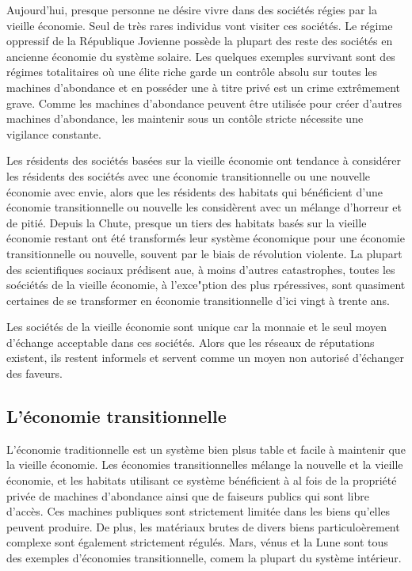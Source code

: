                Aujourd'hui, presque personne ne désire vivre dans des sociétés régies par la vieille économie. Seul de très rares individus vont visiter ces sociétés. Le régime oppressif de la République Jovienne possède la plupart des reste des sociétés en ancienne économie du système solaire. Les quelques exemples survivant sont des régimes totalitaires où une élite riche garde un contrôle absolu sur toutes les machines d'abondance et en posséder une à titre privé est un crime extrêmement grave. Comme les machines d'abondance peuvent être utilisée pour créer d'autres machines d'abondance, les maintenir sous un contôle stricte nécessite une vigilance constante. 

               Les résidents des sociétés basées sur la vieille économie ont tendance à considérer les résidents des sociétés avec une économie transitionnelle ou une nouvelle économie avec envie, alors que les résidents des habitats qui bénéficient d'une économie transitionnelle ou nouvelle les considèrent avec un mélange d'horreur et de pitié. Depuis la Chute, presque un tiers des habitats basés sur la vieille économie restant ont été transformés leur système économique pour une économie transitionnelle ou nouvelle, souvent par le biais de révolution violente. La plupart des scientifiques sociaux prédisent aue, à moins d'autres catastrophes, toutes les soéciétés de la vieille économie, à l'exce"ption des plus rpéressives, sont quasiment certaines de se transformer en économie transitionnelle d'ici vingt à trente ans. 

               Les sociétés de la vieille économie sont unique car la monnaie et le seul moyen d'échange acceptable dans ces sociétés. Alors que les réseaux de réputations existent, ils restent informels et servent comme un moyen non autorisé d'échanger des faveurs. 

               \subsection{L'économie transitionnelle} \label{sec:transitional-economy} 

               L'économie traditionnelle est un système bien plsus table et facile à maintenir que la vieille économie. Les économies transitionnelles mélange la nouvelle et la vieille économie, et les habitats utilisant ce système bénéficient à al fois de la propriété privée de machines d'abondance ainsi que de faiseurs publics qui sont libre d'accès. Ces machines publiques sont strictement limitée dans les biens qu'elles peuvent produire. De plus, les matériaux brutes de divers biens particuloèrement complexe sont également strictement régulés. Mars, vénus et la Lune sont tous des exemples d'économies transitionnelle, comem la plupart du système intérieur. 

